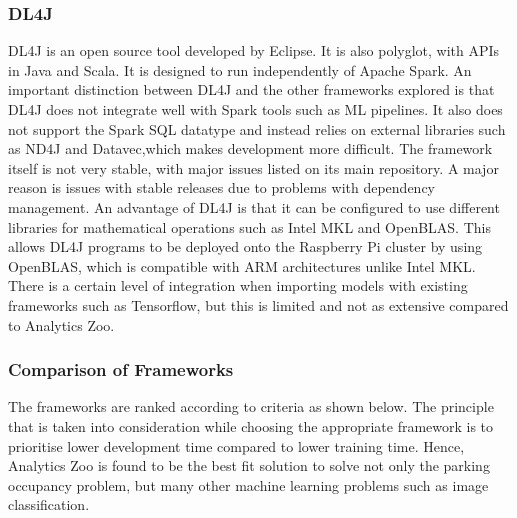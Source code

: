     \subsubsection{DL4J}
        \begin{flushleft}
          DL4J is an open source tool developed by Eclipse. It is also polyglot, with APIs in Java and Scala. It is designed to run independently of Apache Spark. An important distinction between DL4J and the other frameworks explored is that DL4J does not integrate well with Spark tools such as ML pipelines. It also does not support the Spark SQL datatype and instead relies on external libraries such as ND4J and Datavec,which makes development more difficult. The framework itself is not very stable, with major issues listed on its main repository. A major reason is issues with stable releases due to problems with dependency management. An advantage of DL4J is that it can be configured to use different libraries for mathematical operations such as Intel MKL and OpenBLAS. This allows DL4J programs to be deployed onto the Raspberry Pi cluster by using OpenBLAS, which is compatible with ARM architectures unlike Intel MKL. There is a certain level of integration when importing models with existing frameworks such as Tensorflow, but this is limited and not as extensive compared to Analytics Zoo.
        \end{flushleft}  
    \subsubsection{Comparison of Frameworks}    
        
        \begin{flushleft}
            The frameworks are ranked according to criteria as shown below. The principle that is taken into consideration while choosing the appropriate framework is to prioritise lower development time compared to lower training time. Hence, Analytics Zoo is found to be the best fit solution to solve not only the parking occupancy problem, but many other machine learning problems such as image classification. 
        \end{flushleft}
        
